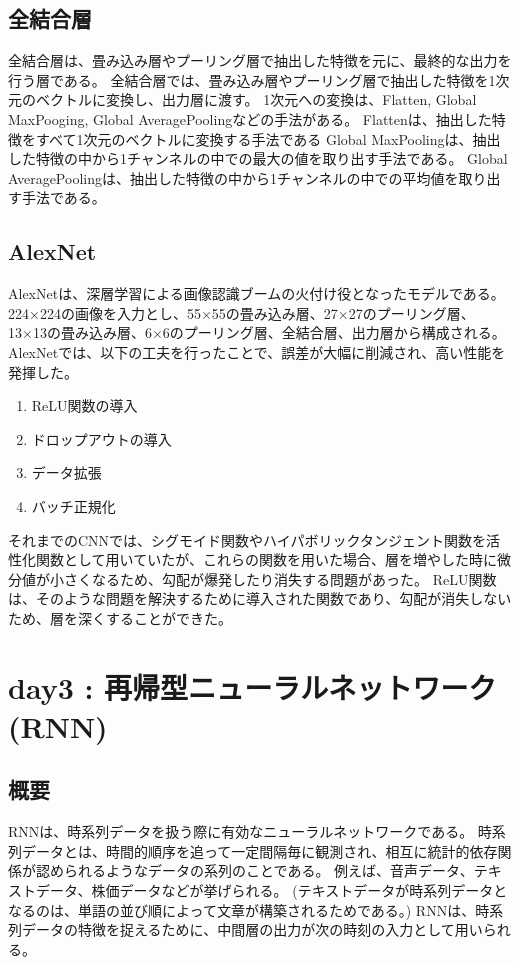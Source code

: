 \documentclass{ltjsarticle}
\begin{document}
\subsection{全結合層}
全結合層は、畳み込み層やプーリング層で抽出した特徴を元に、最終的な出力を行う層である。
全結合層では、畳み込み層やプーリング層で抽出した特徴を1次元のベクトルに変換し、出力層に渡す。
1次元への変換は、Flatten, Global MaxPooging, Global AveragePoolingなどの手法がある。
Flattenは、抽出した特徴をすべて1次元のベクトルに変換する手法である
Global MaxPoolingは、抽出した特徴の中から1チャンネルの中での最大の値を取り出す手法である。
Global AveragePoolingは、抽出した特徴の中から1チャンネルの中での平均値を取り出す手法である。


\subsection{AlexNet}
AlexNetは、深層学習による画像認識ブームの火付け役となったモデルである。
224×224の画像を入力とし、55×55の畳み込み層、27×27のプーリング層、13×13の畳み込み層、6×6のプーリング層、全結合層、出力層から構成される。
AlexNetでは、以下の工夫を行ったことで、誤差が大幅に削減され、高い性能を発揮した。
\begin{enumerate}
  \item ReLU関数の導入
  \item ドロップアウトの導入
  \item データ拡張
  \item バッチ正規化
\end{enumerate}

それまでのCNNでは、シグモイド関数やハイパボリックタンジェント関数を活性化関数として用いていたが、これらの関数を用いた場合、層を増やした時に微分値が小さくなるため、勾配が爆発したり消失する問題があった。
ReLU関数は、そのような問題を解決するために導入された関数であり、勾配が消失しないため、層を深くすることができた。

\newpage

\section{day3 : 再帰型ニューラルネットワーク(RNN)}
\subsection{概要}
RNNは、時系列データを扱う際に有効なニューラルネットワークである。
時系列データとは、時間的順序を追って一定間隔毎に観測され、相互に統計的依存関係が認められるようなデータの系列のことである。
例えば、音声データ、テキストデータ、株価データなどが挙げられる。
(テキストデータが時系列データとなるのは、単語の並び順によって文章が構築されるためである。)
RNNは、時系列データの特徴を捉えるために、中間層の出力が次の時刻の入力として用いられる。
\end{document}
